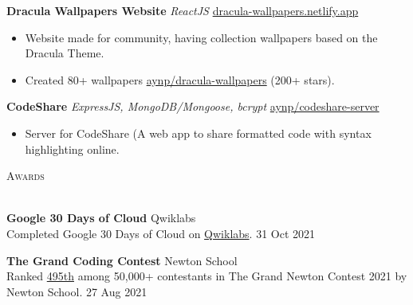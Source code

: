 \documentclass[a4paper]{article}
\newcommand{\lineunder} {
    \vspace*{-8pt} \\
    \hspace*{-18pt} \hrulefill \\
}
\newcommand{\header} [1] {
    {\hspace*{-18pt}\vspace*{6pt} \textsc{#1}}
    \vspace*{-6pt} \lineunder
}
\begin{document}
{\textbf{Dracula Wallpapers Website}} {\sl ReactJS} \hfill \href{https://dracula-wallpapers.netlify.app/}{dracula-wallpapers.netlify.app}\\
\begin{itemize}
	\item Website made for community, having collection wallpapers based on the Dracula Theme.
	\item Created 80+ wallpapers \href{https://github.com/aynp/dracula-wallpapers}{aynp/dracula-wallpapers} (200+ stars).
\end{itemize}
\vspace*{1.5mm}



{\textbf{CodeShare}} {\sl ExpressJS, MongoDB/Mongoose, bcrypt} \hfill \href{https://github.com/aynp/codeshare-server}{aynp/codeshare-server}\\
\begin{itemize}
	\item Server for CodeShare (A web app to share formatted code with syntax highlighting online.
\end{itemize}
\vspace*{1.5mm}



\header{Awards}
\vspace{1mm}

\textbf{Google 30 Days of Cloud} \hfill Qwiklabs\\
Completed Google 30 Days of Cloud on \href{https://www.qwiklabs.com/public_profiles/4c78c6d8-ad43-4991-b8fe-03e559c1bac5}{Qwiklabs}. \hfill 31 Oct 2021\\
\vspace*{1mm}

\textbf{The Grand Coding Contest} \hfill Newton School\\
Ranked \href{https://www.linkedin.com/posts/aynp_aryan-has-secured-rank-495-in-newtons-grand-activity-6841777869484642304-Za36}{495th} among 50,000+ contestants in The Grand Newton Contest 2021 by Newton School. \hfill 27 Aug 2021\\
\vspace*{1mm}
\end{document}

